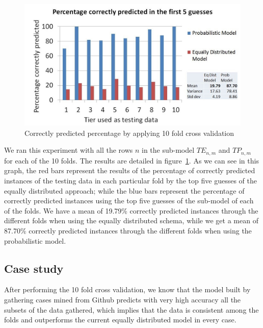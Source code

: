 \documentclass[conference]{IEEEtran}
\begin{document}

\begin{figure}[!h]
  \centering
    \includegraphics[scale=0.33]{sanity1}
  \caption{Correctly predicted percentage by applying 10 fold cross validation}
  \label{fig:results10fcv}
\end{figure}

We ran this experiment with all the rows $n$ in the sub-model $TE_{n,m}$ and 
$TP_{n,m}$ for each of the 10 
folds. The results are detailed in figure~\ref{fig:results10fcv}. As we can see 
in this graph, the red bars represent the results of the percentage of correctly 
predicted instances of the testing data in each particular fold by the top five guesses of the equally distributed approach; while the blue 
bars represent the percentage of correctly predicted instances using the top five 
guesses of the sub-model of each of the folds. We have a mean of 19.79\% 
correctly predicted instances through the different folds when using the equally 
distributed schema, while we get a mean of 87.70\% correctly predicted instances 
through the different folds when using the probabilistic model. 

\subsection{Case study}
After performing the 10 fold cross validation, we know that the model built by 
gathering cases mined from Github predicts with very high accuracy all the 
subsets of the data gathered, which implies that the data is consistent among 
the folds and outperforms the current equally distributed model in every case. 
\end{document}
